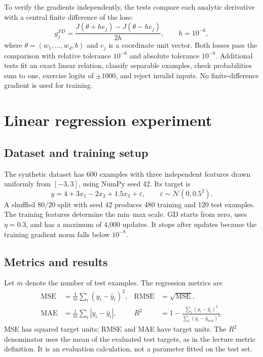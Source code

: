 To verify the gradients independently, the tests compare each analytic derivative with a central finite difference of the loss:
\[
g_j^{FD}=\frac{J(\theta+h e_j)-J(\theta-h e_j)}{2h},\qquad h=10^{-6},
\]
where $\theta=(w_1,\ldots,w_d,b)$ and $e_j$ is a coordinate unit vector. Both losses pass the comparison with relative tolerance $10^{-6}$ and absolute tolerance $10^{-8}$. Additional tests fit an exact linear relation, classify separable examples, check probabilities sum to one, exercise logits of $\pm1000$, and reject invalid inputs. No finite-difference gradient is used for training.

\section{Linear regression experiment}
\subsection{Dataset and training setup}
The synthetic dataset has 600 examples with three independent features drawn uniformly from $[-3,3]$, using NumPy seed 42. Its target is
\[
y=4+3x_1-2x_2+1.5x_3+\varepsilon,\qquad
\varepsilon\sim\mathcal N(0,0.5^2).
\]
A shuffled 80/20 split with seed 42 produces 480 training and 120 test examples. The training features determine the min--max scale. GD starts from zero, uses $\eta=0.3$, and has a maximum of 4,000 updates. It stops after \LinIterations{} updates because the training gradient norm falls below $10^{-8}$.

\subsection{Metrics and results}
Let $m$ denote the number of test examples. The regression metrics are
\[
\begin{aligned}
\mathrm{MSE}&=\frac1m\sum_i(y_i-\hat y_i)^2,&
\mathrm{RMSE}&=\sqrt{\mathrm{MSE}},\\
\mathrm{MAE}&=\frac1m\sum_i|y_i-\hat y_i|,&
R^2&=1-\frac{\sum_i(y_i-\hat y_i)^2}{\sum_i(y_i-\bar y_{test})^2}.
\end{aligned}
\]
MSE has squared target units; RMSE and MAE have target units. The $R^2$ denominator uses the mean of the evaluated test targets, as in the lecture metric definition. It is an evaluation calculation, not a parameter fitted on the test set.

